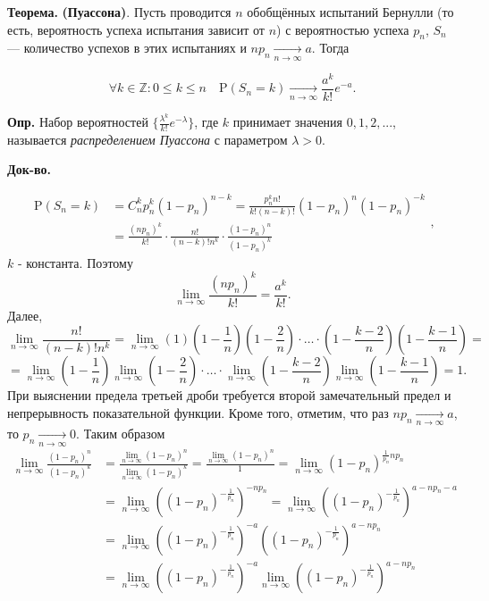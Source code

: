 \documentclass[oneside,final,14pt]{extreport}
\newcommand\mydef{{\bf Опр.}}
\newcommand\myth{{\bf Теорема.}}
\newcommand\myqed{{\bf Док-во.}}
\theoremstyle{definition}
\begin{document}
\myth {} \textbf{(Пуассона)}. Пусть проводится $n$ обобщённых испытаний Бернулли
(то есть, вероятность успеха испытания зависит от $n$) с вероятностью успеха
$p_n$, $S_n$ — количество успехов в этих испытаниях и $n p_{n} \underset{n \rightarrow \infty}{\longrightarrow} a$. Тогда

$$\forall k \in \mathbb{Z}: 0 \leqslant k \leqslant n \quad \mathrm{P}\left(S_{n}=k\right) \underset{n \rightarrow \infty}{\longrightarrow} \frac{a^{k}}{k !} e^{-a}.$$

\mydef{} Набор вероятностей $\{ \frac{\lambda^k}{k!} e^{-\lambda} \}$, где $k$ принимает значения $0, 1, 2, ...$, называется {\it распределением Пуассона} с параметром $\lambda > 0$.

\myqed{} 

$$\begin{aligned}
\mathrm{P}\left(S_{n}=k\right) &=C_{n}^{k} p_{n}^{k}\left(1-p_{n}\right)^{n-k}=\frac{p_{n}^{k} n !}{k !(n-k) !}\left(1-p_{n}\right)^{n}\left(1-p_{n}\right)^{-k} \\
&=\frac{\left(n p_{n}\right)^{k}}{k !} \cdot \frac{n !}{(n-k) ! n^{k}} \cdot \frac{\left(1-p_{n}\right)^{n}}{\left(1-p_{n}\right)^{k}}
\end{aligned},$$
$k$ - константа. Поэтому
$$\lim\limits_{n \rightarrow \infty} \frac{\left(n p_{n}\right)^{k}}{k !}=\frac{a^{k}}{k !}.$$
Далее,
$$\lim _{n \rightarrow \infty} \frac{n !}{(n-k) ! n^{k}}=\lim _{n \rightarrow \infty}(1)\left(1-\frac{1}{n}\right)\left(1-\frac{2}{n}\right) \cdot \ldots \cdot\left(1-\frac{k-2}{n}\right)\left(1-\frac{k-1}{n}\right) =$$
$$=\lim _{n \rightarrow \infty}\left(1-\frac{1}{n}\right) \lim _{n \rightarrow \infty}\left(1-\frac{2}{n}\right) \cdot \ldots \cdot \lim _{n \rightarrow \infty}\left(1-\frac{k-2}{n}\right) \lim _{n \rightarrow \infty}\left(1-\frac{k-1}{n}\right)=1.$$
При выяснении предела третьей дроби требуется второй замечательный предел и
непрерывность показательной функции. Кроме того, отметим, что раз $n p_{n} \underset{n \rightarrow \infty}{\longrightarrow} a$, то $p_{n} \underset{n \rightarrow \infty}{\longrightarrow} 0$. Таким образом
$$\begin{aligned}
\lim _{n \rightarrow \infty} \frac{\left(1-p_{n}\right)^{n}}{\left(1-p_{n}\right)^{k}} &=\frac{\lim _{n \rightarrow \infty}\left(1-p_{n}\right)^{n}}{\lim _{n \rightarrow \infty}\left(1-p_{n}\right)^{k}}=\frac{\lim _{n \rightarrow \infty}\left(1-p_{n}\right)^{n}}{1}=\lim _{n \rightarrow \infty}\left(1-p_{n}\right)^{\frac{1}{p_{n}} n p_{n}} \\
&=\lim _{n \rightarrow \infty}\left(\left(1-p_{n}\right)^{-\frac{1}{p_{n}}}\right)^{-n p_{n}}=\lim _{n \rightarrow \infty}\left(\left(1-p_{n}\right)^{-\frac{1}{p_{n}}}\right)^{a-n p_{n}-a} \\
&=\lim _{n \rightarrow \infty}\left(\left(1-p_{n}\right)^{-\frac{1}{p_{n}}}\right)^{-a}\left(\left(1-p_{n}\right)^{-\frac{1}{p_{n}}}\right)^{a-n p_{n}} \\
&=\lim _{n \rightarrow \infty}\left(\left(1-p_{n}\right)^{-\frac{1}{p_{n}}}\right)^{-a} \lim _{n \rightarrow \infty}\left(\left(1-p_{n}\right)^{-\frac{1}{p_{n}}}\right)^{a-n p_{n}}
\end{aligned}$$
\end{document}
